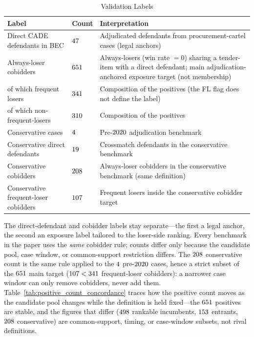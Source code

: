 \begin{table}[htbp]
\centering
\caption{Validation Labels}
\label{tab:validation_labels_app_submission}
\footnotesize
\begin{adjustbox}{max width=\textwidth,center}
\begin{tabular}{L{4.0cm}L{2.6cm}L{7.0cm}}
\toprule
Label & Count & Interpretation \\
\midrule
Direct CADE defendants in BEC & $47$ & Adjudicated defendants from procurement-cartel cases (legal anchors) \\
Always-loser cobidders & $651$ & Always-losers (win rate $=0$) sharing a tender-item with a direct defendant; main adjudication-anchored exposure target (not membership) \\
\quad of which frequent losers & $341$ & Composition of the positives (the FL flag does not define the label) \\
\quad of which non-frequent-losers & $310$ & Composition of the positives \\
Conservative cases & $4$ & Pre-$2020$ adjudication benchmark \\
Conservative direct defendants & $19$ & Crossmatch defendants in the conservative benchmark \\
Conservative cobidders & $208$ & Always-loser cobidders in the conservative benchmark (same definition) \\
Conservative frequent-loser cobidders & $107$ & Frequent losers inside the conservative cobidder target \\
\bottomrule
\end{tabular}
\end{adjustbox}
\end{table}

The direct-defendant and cobidder labels stay separate---the first a
legal anchor, the second an exposure label tailored to the loser-side
ranking. Every benchmark in the paper uses the \emph{same} cobidder
rule; counts differ only because the candidate pool, case window, or
common-support restriction differs. The $208$
conservative count is the same rule applied to the
$4$ pre-$2020$ cases, hence a
strict subset of the $651$ main target
($107 < 341$ frequent-loser cobidders): a
narrower case window can only remove cobidders, never add them.
Table~\ref{tab:positive_count_concordance} traces how the positive
count moves as the candidate pool changes while the definition is held
fixed---the $651$ positives are stable, and the figures
that differ ($498$ rankable incumbents,
$153$ entrants, $208$
conservative) are common-support, timing, or case-window subsets, not
rival definitions.

